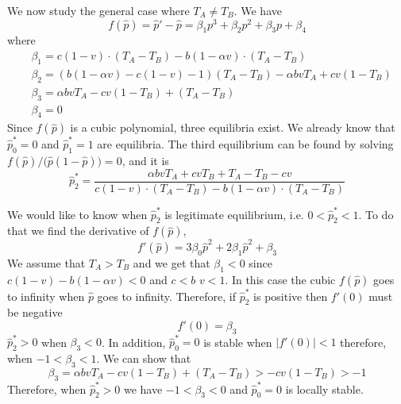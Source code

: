 \documentclass[12pt]{extarticle}
\begin{document}
We now study the general case where $T_A \neq T_B$. We have
\begin{equation} \label{eq:general_case_polynomial}%
  f(\hat{p}) = \hat{p}'-\hat{p} = \beta_1p^3 + \beta_2 p^2 + \beta_3p + \beta_4
\end{equation}
where 
\begin{equation} \label{eq:polynomial_coefficients}
\begin{split}
  & \beta_1 = c(1-v)\cdot(T_A-T_B) -b (1-\alpha v) \cdot(T_A-T_B) \\
  & \beta_2 = (b(1-\alpha v)-c(1-v)-1)(T_A-T_B)-\alpha bv T_A + cv(1-T_B) \\
  & \beta_3 = \alpha bvT_A - cv(1-T_B) + (T_A-T_B) \\
  & \beta_4 = 0
\end{split}
\end{equation}
Since $f(\hat{p})$ is a cubic polynomial, three equilibria exist.
We already know that $\hat{p}^*_0 = 0 $ and $\hat{p}^*_1 = 1$ are equilibria.
The third equilibrium can be found by solving $f(\hat{p})/\big(\hat{p}(1-\hat{p})\big)=0$, and it is
\begin{equation} \label{eq:oblique_and_vertic_result}
  \hat{p}^*_2 =  \frac{\alpha bvT_A + cvT_B + T_A-T_B-cv}{c(1-v)\cdot(T_A-T_B) -b (1-\alpha v) \cdot(T_A-T_B)}
\end{equation}

We would like to know when $\hat{p}^*_2$ is legitimate equilibrium, i.e. $0<\hat{p}^*_2<1$.  
To do that we find the derivative  of $f(\hat{p})$,
\begin{equation} \label{eq:derivative_of_phattag-phat2}
  f'(\hat{p}) = 3\beta_0 \hat{p}^2 + 2\beta_1\hat{p}^2 + \beta_3
 \end{equation}
We assume that $T_A>T_B$ and we get that $\beta_1<0$ since $c(1-v)-b(1-\alpha v)<0$ and $c<b$ $v<1$. %
In this case the cubic $f(\hat{p})$ goes to infinity when $\hat{p}$ goes to infinity. 
Therefore, if $\hat{p}^*_2$ is positive then $f'(0)$ must be negative %
\begin{equation} \label{eq:derivative_of_phattag-phat_p=0}
  f'(0) = \beta_3
 \end{equation}
$\hat{p}^*_2>0$ when $\beta_3<0$.
In addition, $\hat{p}^*_0=0$ is stable when $|f'(0)|<1$ therefore, when $-1<\beta_3<1$.
We can show that
\begin{equation} \label{eq:beta3-condition}
  \beta_3 = \alpha bvT_A - cv(1-T_B) + (T_A-T_B) > -cv(1-T_B) > -1
\end{equation}
Therefore, when $\hat{p}^*_2>0$ we have $-1<\beta_3<0$ and $\hat{p}^*_0=0$ is locally stable. 
\end{document}
